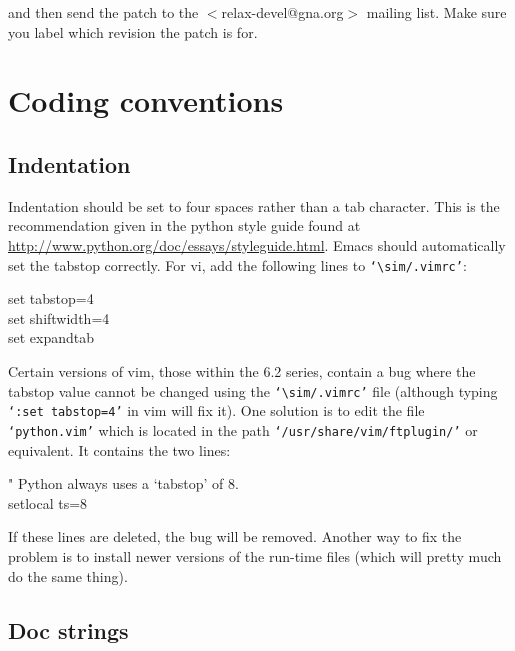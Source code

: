 
and then send the patch to the $<$relax-devel@gna.org$>$ mailing list.  Make sure you label which revision the patch is for.




\section{Coding conventions}


\subsection{Indentation}

Indentation should be set to four spaces rather than a tab character.  This is the recommendation given in the python style guide found at \href{http://www.python.org/doc/essays/styleguide.html}{http://www.python.org/doc/essays/styleguide.html}.  Emacs should automatically set the tabstop correctly.  For vi, add the following lines to \texttt{`$\sim$/.vimrc'}:

\begin{exampleenv}
set tabstop=4 \\
set shiftwidth=4 \\
set expandtab
\end{exampleenv}

Certain versions of vim, those within the 6.2 series, contain a bug where the tabstop value cannot be changed using the \texttt{`$\sim$/.vimrc'} file (although typing \texttt{`:set tabstop=4'} in vim will fix it).  One solution is to edit the file \texttt{`python.vim'} which is located in the path \texttt{`/usr/share/vim/ftplugin/'} or equivalent. It contains the two lines:

\begin{exampleenv}
" Python always uses a `tabstop' of 8. \\
setlocal ts=8
\end{exampleenv}

If these lines are deleted, the bug will be removed.  Another way to fix the problem is to install newer versions of the run-time files (which will pretty much do the same thing).


\subsection{Doc strings}

